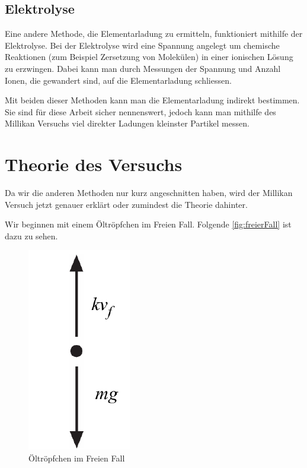 \subsection{Elektrolyse}\label{sub:elektrolyse}
Eine andere Methode, die Elementarladung zu ermitteln, funktioniert mithilfe der Elektrolyse. Bei der Elektrolyse wird eine Spannung angelegt um chemische Reaktionen (zum Beispiel Zersetzung von Molekülen) in einer ionischen Lösung zu erzwingen. Dabei kann man durch Messungen der Spannung und Anzahl Ionen, die gewandert sind, auf die Elementarladung schliessen. 

Mit beiden dieser Methoden kann man die Elementarladung indirekt bestimmen. Sie sind für diese Arbeit sicher nennenswert, jedoch kann man mithilfe des Millikan Versuchs viel direkter Ladungen kleinster Partikel messen.

\section{Theorie des Versuchs}\label{sec:versuchsTheorie}
Da wir die anderen Methoden nur kurz angeschnitten haben, wird der Millikan Versuch jetzt genauer erklärt oder zumindest die Theorie dahinter. 

Wir beginnen mit einem Öltröpfchen im Freien Fall. Folgende \autoref{fig:freierFall} ist dazu zu sehen.

\begin{figure}[h]
	\begin{center}
		\includegraphics[scale=0.5]{bilder/pdf/Abbildung1_FreierFall.pdf}
		\caption{Öltröpfchen im Freien Fall}
		\label{fig:freierFall}
	\end{center}
\end{figure}

